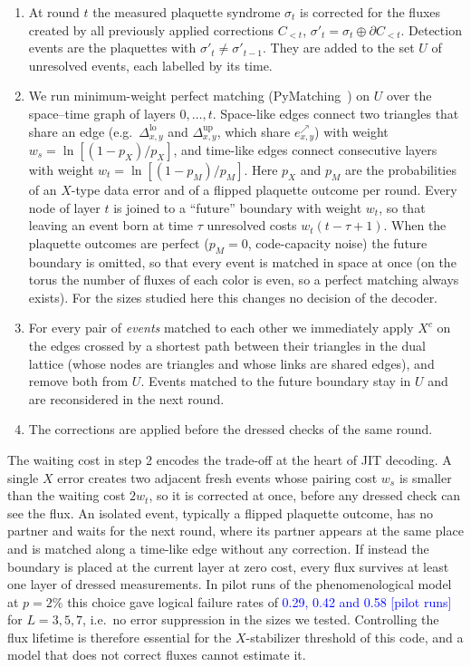 \documentclass[a4paper]{article}
\newcommand{\blue}[1]{\textcolor{blue}{#1}}
\newcommand{\ed}[1]{e^{\nearrow}_{#1}}      %
\newcommand{\tlo}[1]{\Delta^{\mathrm{lo}}_{#1}}
\newcommand{\tup}[1]{\Delta^{\mathrm{up}}_{#1}}
\begin{document}
\begin{enumerate}[leftmargin=*,itemsep=0pt]
\item At round $t$ the measured plaquette syndrome $\sigma_t$ is corrected for the fluxes created by all previously applied corrections $C_{<t}$, $\sigma'_t=\sigma_t\oplus\partial C_{<t}$. Detection events are the plaquettes with $\sigma'_t\neq\sigma'_{t-1}$. They are added to the set $U$ of unresolved events, each labelled by its time.
\item We run minimum-weight perfect matching (PyMatching~\cite{higgott2025pymatching}) on $U$ over the space--time graph of layers $0,\dots,t$. Space-like edges connect two triangles that share an edge (e.g.\ $\tlo{x,y}$ and $\tup{x,y}$, which share $\ed{x,y}$) with weight $w_s=\ln[(1-p_X)/p_X]$, and time-like edges connect consecutive layers with weight $w_t=\ln[(1-p_M)/p_M]$. Here $p_X$ and $p_M$ are the probabilities of an $X$-type data error and of a flipped plaquette outcome per round. Every node of layer $t$ is joined to a ``future'' boundary with weight $w_t$, so that leaving an event born at time $\tau$ unresolved costs $w_t(t-\tau+1)$. When the plaquette outcomes are perfect ($p_M=0$, code-capacity noise) the future boundary is omitted, so that every event is matched in space at once (on the torus the number of fluxes of each color is even, so a perfect matching always exists). For the sizes studied here this changes no decision of the decoder.
\item For every pair of \emph{events} matched to each other we immediately apply $X^c$ on the edges crossed by a shortest path between their triangles in the dual lattice (whose nodes are triangles and whose links are shared edges), and remove both from $U$. Events matched to the future boundary stay in $U$ and are reconsidered in the next round.
\item The corrections are applied before the dressed checks of the same round.
\end{enumerate}
The waiting cost in step 2 encodes the trade-off at the heart of JIT decoding. A single $X$ error creates two adjacent fresh events whose pairing cost $w_s$ is smaller than the waiting cost $2w_t$, so it is corrected at once, before any dressed check can see the flux. An isolated event, typically a flipped plaquette outcome, has no partner and waits for the next round, where its partner appears at the same place and is matched along a time-like edge without any correction. If instead the boundary is placed at the current layer at zero cost, every flux survives at least one layer of dressed measurements. In pilot runs of the phenomenological model at $p=2\%$ this choice gave logical failure rates of \blue{0.29, 0.42 and 0.58 [pilot runs]} for $L=3,5,7$, i.e.\ no error suppression in the sizes we tested. Controlling the flux lifetime is therefore essential for the $X$-stabilizer threshold of this code, and a model that does not correct fluxes cannot estimate it.
\end{document}
